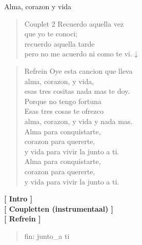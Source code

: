 \begin{song}[vals]{Alma, corazon y vida}
\begin{verse}{Couplet 2}
	\hspace{0.6cm}Recuerdo aquella vez\\
	\hspace{0.6cm}que yo te conoci;\\ 
	\hspace*{0.6cm}recuerdo aquella tarde\\      
	\hspace*{0.6cm}pero no me acuerdo ni como te vi.\hspace{0.5cm}$\downarrow$
\end{verse}
\begin{verse}{Refrein}
Oye esta cancion que lleva\\
alma, corazon, y vida,\\
esas tres cositas nada mas te doy.\\
Porque no tengo fortuna\\
Esas tres cosas te ofrezco\\
alma, corazon, y vida y nada mas.\\
Alma para conquistarte,\\ 
corazon para quererte,\\ 
y vida para vivir la junto a ti.\hspace{0.6cm}    \\
Alma para conquistarte,\\
corazon para quererte,\\
y vida para vivir la junto a ti.\\
\end{verse}

\textbf{[ Intro ]}\\ 
\textbf{[ Coupletten (instrumentaal) ]}\\ 
\textbf{[ Refrein ]}\\ 
\begin{verse}{fin:}
junto\_a ti\hspace{1.5em}  \hspace{1.5em} \\
\end{verse}



\end{song}
